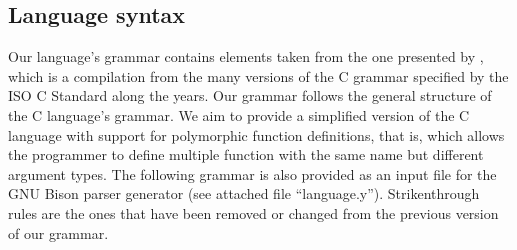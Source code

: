 \subsection{Language syntax}

Our language's grammar contains elements taken from the one presented by \textcite{Harbison2002},
which is a compilation from the many versions of the C grammar specified by the ISO C Standard
along the years. Our grammar follows the general structure of the C language's grammar.
We aim to provide a simplified version of the C language with support for polymorphic function
definitions, that is, which allows the programmer to define multiple function with the same name
but different argument types. The following grammar is also provided as an input file for the
GNU Bison \cite{BISON} parser generator (see attached file ``language.y''). Strikenthrough
rules are the ones that have been removed or changed from the previous version of our grammar.

